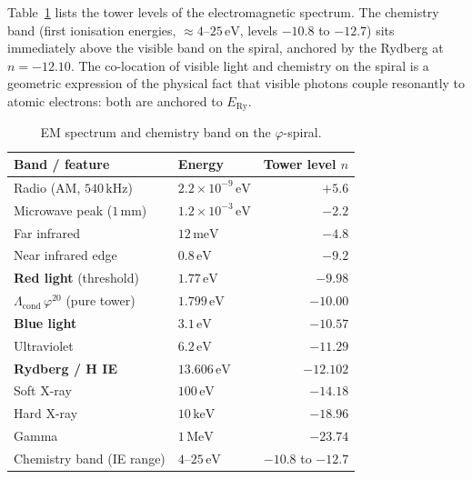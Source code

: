 \documentclass[11pt,a4paper]{article}
\theoremstyle{definition}
\theoremstyle{remark}
\newcommand{\vp}{\varphi}
\newcommand{\Lcond}{\Lambda_{\mathrm{cond}}}
\newcommand{\ERy}{E_{\mathrm{Ry}}}
\begin{document}
Table~\ref{P11:tab:em} lists the tower levels of the electromagnetic
spectrum.  The chemistry band (first ionisation energies,
$\approx 4$--$25\,\mathrm{eV}$, levels $-10.8$ to $-12.7$) sits
immediately above the visible band on the spiral, anchored by the
Rydberg at $n=-12.10$.  The co-location of visible light and
chemistry on the spiral is a geometric expression of the
physical fact that visible photons couple resonantly to atomic
electrons: both are anchored to $\ERy$.

\begin{table}[h]
\centering
\caption{EM spectrum and chemistry band on the $\vp$-spiral.}
\label{P11:tab:em}
\begin{tabular}{llr}
\toprule
Band / feature & Energy & Tower level $n$ \\
\midrule
Radio (AM, $540\,\mathrm{kHz}$) & $2.2\times10^{-9}\,\mathrm{eV}$ & $+5.6$ \\
Microwave peak ($1\,\mathrm{mm}$) & $1.2\times10^{-3}\,\mathrm{eV}$ & $-2.2$ \\
Far infrared                     & $12\,\mathrm{meV}$               & $-4.8$ \\
Near infrared edge               & $0.8\,\mathrm{eV}$               & $-9.2$ \\
\textbf{Red light} (threshold)   & $\mathbf{1.77\,\mathrm{eV}}$     & $\mathbf{-9.98}$ \\
$\Lcond\,\vp^{20}$ (pure tower)  & $1.799\,\mathrm{eV}$             & $-10.00$ \\
\textbf{Blue light}              & $\mathbf{3.1\,\mathrm{eV}}$      & $\mathbf{-10.57}$ \\
Ultraviolet                      & $6.2\,\mathrm{eV}$               & $-11.29$ \\
\textbf{Rydberg / H IE}          & $\mathbf{13.606\,\mathrm{eV}}$   & $\mathbf{-12.102}$ \\
Soft X-ray                       & $100\,\mathrm{eV}$               & $-14.18$ \\
Hard X-ray                       & $10\,\mathrm{keV}$               & $-18.96$ \\
Gamma                            & $1\,\mathrm{MeV}$                & $-23.74$ \\
\midrule
Chemistry band (IE range)        & $4$--$25\,\mathrm{eV}$           & $-10.8$ to $-12.7$ \\
\bottomrule
\end{tabular}
\end{table}
\end{document}
